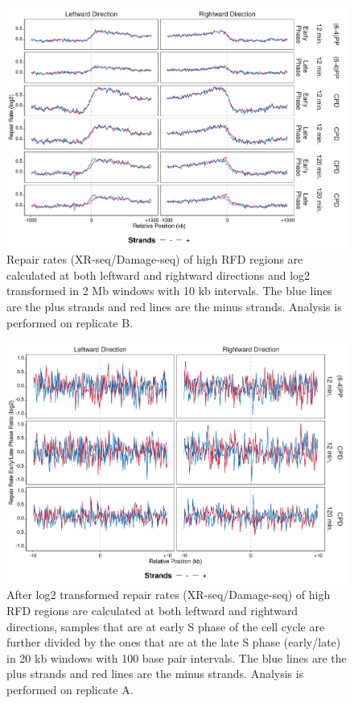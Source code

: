 \begin{figure}[H]
\begin{center}
\includegraphics[width=\textwidth]{Chapters/7_appendix/figures/supfig67}
\caption[Repair rate of high RFDs in 2 Mb (replicate B).]{Repair rates (XR-seq/Damage-seq) of high RFD regions are calculated at both leftward and rightward directions and log2 transformed in 2 Mb windows with 10 kb intervals. The blue lines are the plus strands and red lines are the minus strands. Analysis is performed on replicate B.}
\label{supfig:rr2000rfdB}
\end{center}
\end{figure}

\begin{figure}[H]
\begin{center}
\includegraphics[width=\textwidth]{Chapters/7_appendix/figures/supfig68}
\caption[Repair rate early/late ratio of high RFDs in 20 kb (replicate A).]{After log2 transformed repair rates (XR-seq/Damage-seq) of high RFD regions are calculated at both leftward and rightward directions, samples that are at early S phase of the cell cycle are further divided by the ones that are at the late S phase (early/late) in 20 kb windows with 100 base pair intervals. The blue lines are the plus strands and red lines are the minus strands. Analysis is performed on replicate A.}
\label{supfig:rrel20rfdA}
\end{center}
\end{figure}

